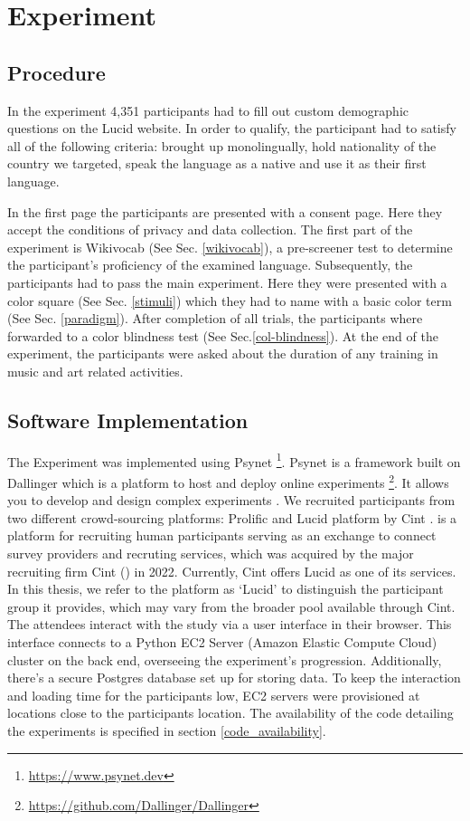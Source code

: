 \section{Experiment}

\subsection{Procedure}
 In the experiment 4,351 participants had to fill out custom demographic questions on the Lucid website. In order to qualify, the participant had to satisfy all of the following criteria: brought up monolingually, hold nationality of the country we targeted, speak the language as a native and use it as their first language.

In the first page the participants are presented with a consent page. Here they accept the conditions of privacy and data collection. The first part of the experiment is Wikivocab (See Sec. \ref{wikivocab}), a pre-screener test to determine the participant's proficiency of the examined language. Subsequently, the participants had to pass the main experiment. Here they were presented with a color square (See Sec. \ref{stimuli}) which they had to name with a basic color term (See Sec. \ref{paradigm}). After completion of all trials, the participants where forwarded to a color blindness test (See Sec.\ref{col-blindness}). At the end of the experiment, the participants were asked about the duration of any training in music and art related activities.

\subsection{Software Implementation}
The Experiment was implemented using Psynet \footnote{\url{https://www.psynet.dev}}. Psynet is a framework built on Dallinger which is a platform to host and deploy online experiments \footnote{\url{https://github.com/Dallinger/Dallinger}}. It allows you to develop and design complex experiments \parencite{harrisonGibbs2020}. We recruited participants from two different crowd-sourcing platforms: Prolific \parencite{prolific} and Lucid platform by Cint \parencite{lucid,cint}. \textcite{lucid} is a platform for recruiting human participants serving as an exchange to connect survey providers and recruting services, which was acquired by the major recruiting firm Cint (\cite{cint}) in 2022. Currently, Cint offers Lucid as one of its services. In this thesis, we refer to the platform as `Lucid' to distinguish the participant group it provides, which may vary from the broader pool available through Cint. The attendees interact with the study via a user interface in their browser. This interface connects to a Python EC2 Server (Amazon Elastic Compute Cloud) cluster on the back end, overseeing the experiment's progression. Additionally, there's a secure Postgres database set up for storing data. To keep the interaction and loading time for the participants low, EC2 servers were provisioned at locations close to the participants location. The availability of the code detailing the experiments is specified in section \ref{code_availability}.

